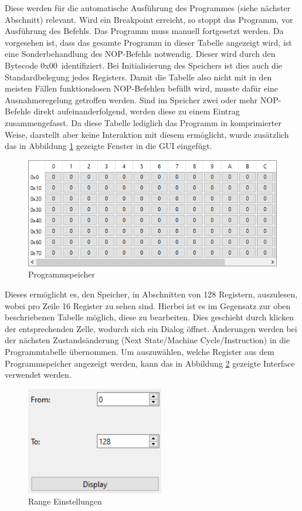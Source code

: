 \documentclass[12pt]{article}
\newcommand{\imgSpaceBefore}{\vspace{10pt}}
\begin{document}
\noindent
Diese werden für die automatische Ausführung des Programmes (siehe nächster Abschnitt) relevant. Wird ein Breakpoint erreicht, so stoppt das Programm, vor Ausführung des Befehls. Das Programm muss manuell fortgesetzt werden. Da vorgesehen ist, dass das gesamte Programm in dieser Tabelle angezeigt wird, ist eine Sonderbehandlung des NOP-Befehls notwendig. Dieser wird durch den Bytecode \glqq 0x00\grqq\ identifiziert. Bei Initialisierung des Speichers ist dies auch die Standardbelegung jedes Registers. Damit die Tabelle also nicht mit in den meisten Fällen funktionslosen NOP-Befehlen befüllt wird, musste dafür eine Ausnahmeregelung getroffen werden. Sind im Speicher zwei oder mehr NOP-Befehle direkt aufeinanderfolgend, werden diese zu einem Eintrag zusammengefasst. Da diese Tabelle lediglich das Programm in komprimierter Weise, darstellt aber keine Interaktion mit diesem ermöglicht, wurde zusätzlich das in Abbildung \ref{fig:ProgSpeicher} gezeigte Fenster in die GUI eingefügt.\imgSpaceBefore

\begin{figure}[H]
\centering
\includegraphics[width=12cm]{bilder/ProgramMemory}
\caption{Programmspeicher}
\label{fig:ProgSpeicher}
\end{figure}

\noindent
Dieses ermöglicht es, den Speicher, in Abschnitten von 128 Registern, auszulesen, wobei pro Zeile 16 Register zu sehen sind. Hierbei ist es im Gegensatz zur oben beschriebenen Tabelle möglich, diese zu bearbeiten. Dies geschieht durch klicken der entsprechenden Zelle, wodurch sich ein Dialog öffnet. Änderungen werden bei der nächsten Zustandsänderung (\glqq Next State/Machine Cycle/Instruction\grqq) in die Programmtabelle übernommen. Um auszuwählen, welche Register aus dem Programmspeicher angezeigt werden, kann das in Abbildung \ref{fig:Range} gezeigte Interface verwendet werden.\imgSpaceBefore

\begin{figure}[h]
\centering
\includegraphics[width=6cm]{bilder/Range}
\caption{Range Einstellungen}
\label{fig:Range}
\end{figure}
\end{document}
